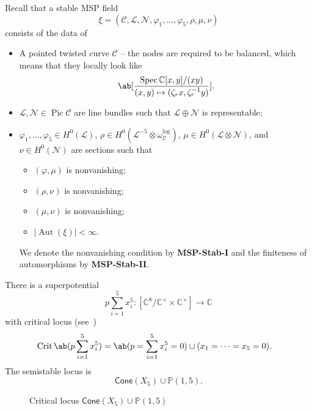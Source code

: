 \documentclass[10pt,oldfontcommands,oneside]{memoir}
\theoremstyle{definition}
\theoremstyle{remark}
\theoremstyle{plain}
\theoremstyle{definition}
\theoremstyle{remark}
\newcommand{\C}{\mathbb{C}}
\renewcommand{\P}{\mathbb{P}}
\newcommand{\mc}[1]{\mathcal{#1}}
\newcommand{\on}[1]{\operatorname{#1}}
\newcommand{\ms}[1]{\mathsf{#1}}
\newcommand{\1}{\mathbf{1}}
\newcommand{\2}{\mathbf{2}}
\newcommand{\3}{\mathbf{3}}
\DeclareMathOperator{\Aut}{Aut}
\DeclareMathOperator{\Pic}{Pic}
\DeclareMathOperator{\Spec}{Spec}
\begin{document}
Recall that a stable MSP field
\[ \xi = (\mc{C}, \mc{L}, \mc{N}, \varphi_1, \ldots, \varphi_5, \rho, \mu, \nu) \]
consists of the data of
\begin{itemize}
    \item A pointed twisted curve $\mc{C}$ -- the nodes are required to be balanced, which means that they locally look like
        \[ \ab[\frac{\Spec \C[x,y]/(xy)}{(x,y) \mapsto (\zeta_r x, \zeta_r^{-1}y)}]. \]
    \item $\mc{L}, \mc{N} \in \Pic \mc{C}$ are line bundles such that $\mc{L} \oplus \mc{N}$ is representable;
    \item $\varphi_1, \ldots, \varphi_5 \in H^0(\mc{L})$, $\rho \in H^0(\mc{L}^{-5} \otimes \omega_{\mc{C}}^{\log})$, $\mu \in H^0(\mc{L} \otimes \mc{N})$, and $\nu \in H^0(\mc{N})$ are sections such that
        \begin{itemize}
            \item $(\varphi, \mu)$ is nonvanishing;
            \item $(\rho, \nu)$ is nonvanishing;
            \item $(\mu, \nu)$ is nonvanishing;
            \item $|\Aut(\xi)|< \infty$.
        \end{itemize}
        We denote the nonvanishing condition by \textbf{MSP-Stab-I} and the finiteness of automorphisms by \textbf{MSP-Stab-II}.
\end{itemize}
There is a superpotential
\[ p \sum_{i=1}^5 x_i^5 \colon [\C^8 / \C^{\times} \times \C^{\times}] \to \C \]
with critical locus (see~)
\begin{align*}
    \on{Crit} \ab(p \sum_{i=1}^5 x_i^5) &= \ab(p = \sum_{i=1}^5 x_i^5 = 0) \cup (x_1 = \cdots = x_5 = 0).
\end{align*}
The semistable locus is
\[ \ms{Cone}(X_5) \cup \P(1,5).\]
\begin{figure}[htpb]
\begin{center}
\end{center}
\caption{Critical locus $\ms{Cone}(X_5) \cup \P(1,5)$}%
\label{fig:crit}
\end{figure}
\end{document}
